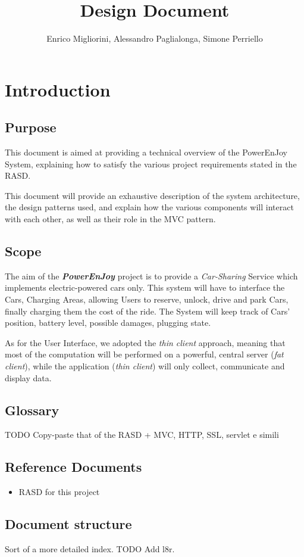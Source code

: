 \documentclass[12pt]{article}
\title{Design Document}
\author{Enrico Migliorini, Alessandro Paglialonga, Simone Perriello}
\begin{document}
\maketitle
\clearpage
\tableofcontents
\clearpage

\section{Introduction}
\subsection{Purpose}
This document is aimed at providing a technical overview of the PowerEnJoy System, explaining how to satisfy the various project requirements stated in the RASD.

This document will provide an exhaustive description of the system architecture, the design patterns used, and explain how the various components will interact with each other, as well as their role in the MVC pattern.
\subsection{Scope}
The aim of the \textbf{\emph{PowerEnJoy}} project is to provide a \textit{Car-Sharing} Service which implements electric-powered cars only.
This system will have to interface the Cars, Charging Areas, allowing Users to reserve, unlock, drive and park Cars, finally charging them the cost of the ride. 
The System will keep track of Cars' position, battery level, possible damages, plugging state.

As for the User Interface, we adopted the \emph{thin client} approach, meaning that most of the computation will be performed on a powerful, central server (\emph{fat client}), while the application (\emph{thin client}) will only collect, communicate and display data.
\subsection{Glossary}
TODO Copy-paste that of the RASD + MVC, HTTP, SSL, servlet e simili
\subsection{Reference Documents}
\begin{itemize}
	\item RASD for this project
\end{itemize}
\subsection{Document structure}
Sort of a more detailed index. TODO Add l8r.
\end{document}
